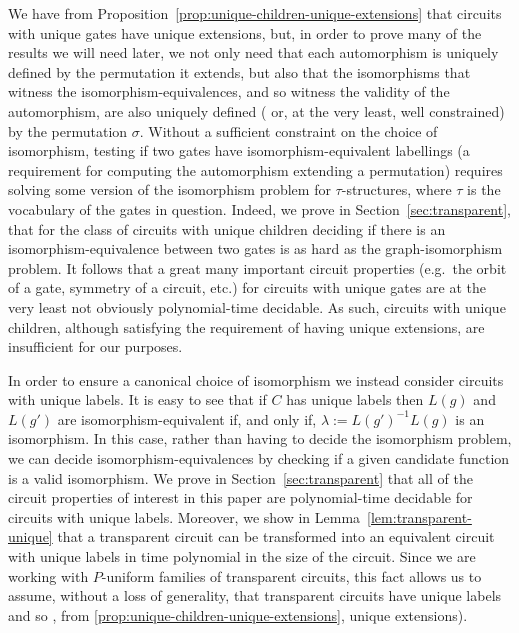 \documentclass[../paper.tex]{subfiles}
\begin{document}
We have from Proposition~\ref{prop:unique-children-unique-extensions} that
circuits with unique gates have unique extensions, but, in order to prove many
of the results we will need later, we not only need that each automorphism is
uniquely defined by the permutation it extends, but also that the isomorphisms
that witness the isomorphism-equivalences, and so witness the validity of the
automorphism, are also uniquely defined ( or, at the very least, well
constrained) by the permutation $\sigma$. Without a sufficient constraint on the
choice of isomorphism, testing if two gates have isomorphism-equivalent
labellings (a requirement for computing the automorphism extending a
permutation) requires solving some version of the isomorphism problem for
$\tau$-structures, where $\tau$ is the vocabulary of the gates in question.
Indeed, we prove in Section~\ref{sec:transparent}, that for the class of
circuits with unique children deciding if there is an isomorphism-equivalence
between two gates is as hard as the graph-isomorphism problem. It follows that a
great many important circuit properties (e.g.\ the orbit of a gate, symmetry of
a circuit, etc.) for circuits with unique gates are at the very least not
obviously polynomial-time decidable. As such, circuits with unique children,
although satisfying the requirement of having unique extensions, are
insufficient for our purposes.


In order to ensure a canonical choice of isomorphism we instead consider
circuits with unique labels. It is easy to see that if $C$ has unique labels
then $L(g)$ and $L(g')$ are isomorphism-equivalent if, and only if, $\lambda :=
L(g')^{-1}L(g)$ is an isomorphism. In this case, rather than having to decide
the isomorphism problem, we can decide isomorphism-equivalences by checking if a
given candidate function is a valid isomorphism. We prove in
Section~\ref{sec:transparent} that all of the circuit properties of interest in
this paper are polynomial-time decidable for circuits with unique labels.
Moreover, we show in Lemma~\ref{lem:transparent-unique} that a transparent
circuit can be transformed into an equivalent circuit with unique labels in time
polynomial in the size of the circuit. Since we are working with $P$-uniform
families of transparent circuits, this fact allows us to assume, without a loss
of generality, that transparent circuits have unique labels and so , from
\ref{prop:unique-children-unique-extensions}, unique extensions).
\end{document}
